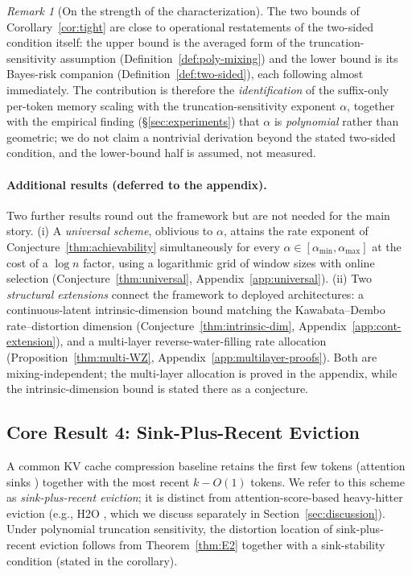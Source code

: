 \documentclass[11pt]{article}
\theoremstyle{plain}
\theoremstyle{definition}
\theoremstyle{remark}
\newtheorem{remark}[theorem]{Remark}
\begin{document}
\begin{remark}[On the strength of the characterization]
\label{rmk:char-strength}
The two bounds of Corollary~\ref{cor:tight} are close to operational
restatements of the two-sided condition itself: the upper bound is the
averaged form of the truncation-sensitivity assumption
(Definition~\ref{def:poly-mixing}) and the lower bound is its
Bayes-risk companion (Definition~\ref{def:two-sided}), each following
almost immediately. The contribution is therefore the
\emph{identification} of the suffix-only per-token memory scaling with
the truncation-sensitivity exponent $\alpha$, together with the
empirical finding (\S\ref{sec:experiments}) that $\alpha$ is
\emph{polynomial} rather than geometric; we do not claim a nontrivial
derivation beyond the stated two-sided condition, and the lower-bound
half is assumed, not measured.
\end{remark}

\paragraph{Additional results (deferred to the appendix).}
Two further results round out the framework but are not needed for
the main story. (i) A \emph{universal scheme}, oblivious to $\alpha$,
attains the rate exponent of Conjecture~\ref{thm:achievability}
simultaneously for every $\alpha \in [\alpha_{\min}, \alpha_{\max}]$
at the cost of a $\log n$ factor, using a logarithmic grid of window
sizes with online selection (Conjecture~\ref{thm:universal},
Appendix~\ref{app:universal}). (ii) Two \emph{structural extensions}
connect the framework to deployed architectures: a continuous-latent
intrinsic-dimension bound matching the Kawabata--Dembo
rate--distortion dimension (Conjecture~\ref{thm:intrinsic-dim},
Appendix~\ref{app:cont-extension}), and a multi-layer
reverse-water-filling rate allocation
(Proposition~\ref{thm:multi-WZ}, Appendix~\ref{app:multilayer-proofs}).
Both are mixing-independent; the multi-layer allocation is proved in
the appendix, while the intrinsic-dimension bound is stated there as a
conjecture.

\subsection{Core Result 4: Sink-Plus-Recent Eviction}
\label{sec:topk}

A common KV cache compression baseline retains the first few tokens
(attention sinks \citep{xiao2024efficient}) together with the most
recent $k - O(1)$ tokens. We refer to this scheme as
\emph{sink-plus-recent eviction}; it is distinct from
attention-score-based heavy-hitter eviction (e.g., H2O
\citep{zhang2023h2o}, which we discuss separately in
Section~\ref{sec:discussion}). Under polynomial truncation sensitivity, the
distortion location of sink-plus-recent eviction follows
from Theorem~\ref{thm:E2} together with a sink-stability condition
(stated in the corollary).
\end{document}
